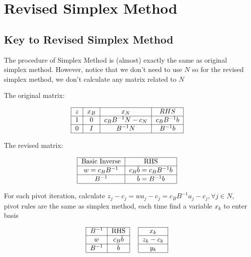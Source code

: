     \section{Revised Simplex Method}
        \subsection{Key to Revised Simplex Method}
            The procedure of Simplex Method is (almost) exactly the same as original simplex method. However, notice that we don't need to use $N$ so for the revised simplex method, we don't calculate any matrix related to $N$

            The original matrix:

            \begin{align}
                \begin{tabular} {|c|c|c|c|}
                    \hline
                    $z$ & $x_B$ & $x_N$ & $RHS$ \\
                    \hline
                    1 & 0 & $c_BB^{-1}N - c_N$ & $c_BB^{-1}b$ \\
                    \hline
                    0 & $I$ & $B^{-1}N$ & $B^{-1}b$ \\
                    \hline
                \end{tabular} \nonumber     
            \end{align}

            The revised matrix:

            \begin{align}
                \begin{tabular} {|c|c|}
                    \hline
                    Basic Inverse & RHS \\
                    \hline
                    $w=c_BB^{-1}$ & $c_B\bar{b} = c_BB^{-1}b$\\
                    \hline
                    $B^{-1}$ & $\bar{b} = B^{-1}b$\\
                    \hline
                \end{tabular} \nonumber
            \end{align}

            For each pivot iteration, calculate $z_j - c_j = wa_j - c_j = c_BB^{-1}a_j - c_j, \forall j\in N$, pivot rules are the same as simplex method, each time find a variable $x_k$ to enter basis

            \begin{align}
                \begin{tabular}{|c|c|c|c|}
                    \cline{1-2} \cline{4-4} $B^{-1}$ & RHS & & $x_k$ \\
                    \cline{1-2} \cline{4-4} $w$ & $c_B\bar{b}$ & & $z_k-c_k$ \\
                    \cline{1-2} \cline{4-4} $B^{-1}$ & $\bar{b}$ & & $y_k$ \\
                    \cline{1-2} \cline{4-4}
                \end{tabular} \nonumber
            \end{align}

